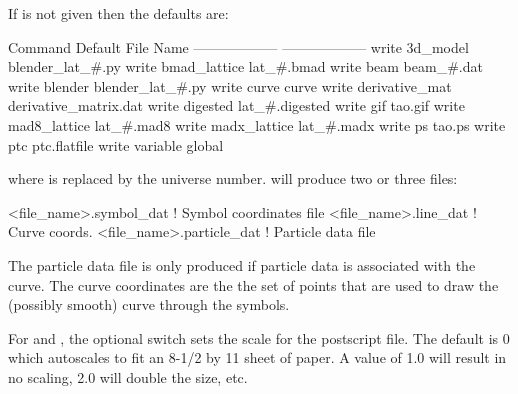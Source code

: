 {{{{{{{{{\vskip 7pt 

If  is not given then the defaults are:
\begin{example}
  Command                        Default File Name
  ------------------             ------------------
  write 3d_model                 blender_lat_#.py
  write bmad_lattice             lat_#.bmad
  write beam                     beam_#.dat
  write blender                  blender_lat_#.py
  write curve                    curve
  write derivative_mat           derivative_matrix.dat              
  write digested                 lat_#.digested
  write gif                      tao.gif
  write mad8_lattice             lat_#.mad8
  write madx_lattice             lat_#.madx
  write ps                       tao.ps
  write ptc                      ptc.flatfile
  write variable                 global%
\end{example}
where \vn{\#} is replaced by the universe number.  will produce two or
three files:
\begin{example}
  <file_name>.symbol_dat    ! Symbol coordinates file
  <file_name>.line_dat      ! Curve coords.
  <file_name>.particle_dat  ! Particle data file
\end{example}
The particle data file is only produced if particle data is associated with the curve.
The curve coordinates are the the set of points that are used to draw the (possibly
smooth) curve through the symbols.

For  and , the optional  switch sets the scale for the
postscript file. The default is 0 which autoscales to fit an 8-1/2 by 11 sheet of paper. A
value of 1.0 will result in no scaling, 2.0 will double the size, etc.

}}}}}}}}}
